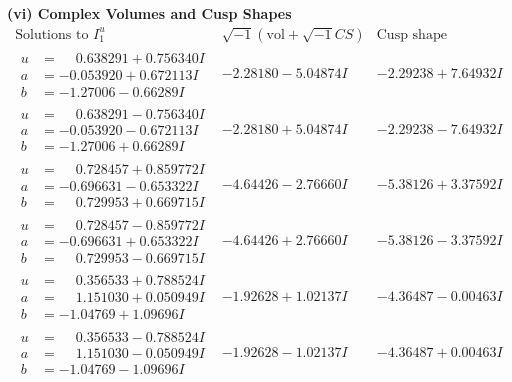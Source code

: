 \documentclass[1p]{elsarticle_modified}
\theoremstyle{definition}
\newcommand{\I}{\sqrt{-1}}
\begin{document}
\newpage\flushleft \textbf{(vi) Complex Volumes and Cusp Shapes}
$$\begin{array}{c|c|c}  
\text{Solutions to }I^u_{1}& \I (\text{vol} + \sqrt{-1}CS) & \text{Cusp shape}\\
 \hline 
\begin{aligned}
u &= \phantom{-}0.638291 + 0.756340 I \\
a &= -0.053920 + 0.672113 I \\
b &= -1.27006 - 0.66289 I\end{aligned}
 & -2.28180 - 5.04874 I & -2.29238 + 7.64932 I \\ \hline\begin{aligned}
u &= \phantom{-}0.638291 - 0.756340 I \\
a &= -0.053920 - 0.672113 I \\
b &= -1.27006 + 0.66289 I\end{aligned}
 & -2.28180 + 5.04874 I & -2.29238 - 7.64932 I \\ \hline\begin{aligned}
u &= \phantom{-}0.728457 + 0.859772 I \\
a &= -0.696631 - 0.653322 I \\
b &= \phantom{-}0.729953 + 0.669715 I\end{aligned}
 & -4.64426 - 2.76660 I & -5.38126 + 3.37592 I \\ \hline\begin{aligned}
u &= \phantom{-}0.728457 - 0.859772 I \\
a &= -0.696631 + 0.653322 I \\
b &= \phantom{-}0.729953 - 0.669715 I\end{aligned}
 & -4.64426 + 2.76660 I & -5.38126 - 3.37592 I \\ \hline\begin{aligned}
u &= \phantom{-}0.356533 + 0.788524 I \\
a &= \phantom{-}1.151030 + 0.050949 I \\
b &= -1.04769 + 1.09696 I\end{aligned}
 & -1.92628 + 1.02137 I & -4.36487 - 0.00463 I \\ \hline\begin{aligned}
u &= \phantom{-}0.356533 - 0.788524 I \\
a &= \phantom{-}1.151030 - 0.050949 I \\
b &= -1.04769 - 1.09696 I\end{aligned}
 & -1.92628 - 1.02137 I & -4.36487 + 0.00463 I \\ \hline\begin{aligned}

\end{aligned}
\end{array}$$
\end{document}

